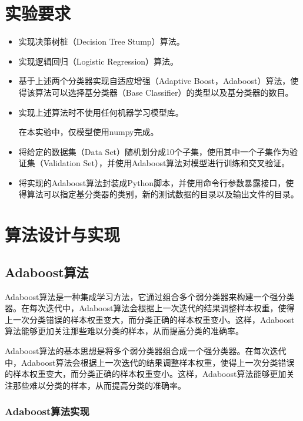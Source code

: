 \documentclass{paper}
\begin{document}
\tableofcontents
\newpage

\section{实验要求}
	\begin{itemize}
		\item 实现决策树桩（Decision Tree Stump）算法。
		\item 实现逻辑回归（Logistic Regression）算法。
		\item 基于上述两个分类器实现自适应增强（Adaptive Boost，Adaboost）算法，使得该算法可以选择基分类器（Base Classifier）的类型以及基分类器的数目。
		\item 实现上述算法时不使用任何机器学习模型库。

                在本实验中，仅模型使用numpy完成。

		\item 将给定的数据集（Data Set）随机划分成10个子集，使用其中一个子集作为验证集（Validation Set），并使用Adaboost算法对模型进行训练和交叉验证。
		\item 将实现的Adaboost算法封装成Python脚本，并使用命令行参数暴露接口，使得算法可以指定基分类器的类别，新的测试数据的目录以及输出文件的目录。
	\end{itemize}



\section{算法设计与实现}
	\subsection{Adaboost算法}

	    Adaboost算法是一种集成学习方法，它通过组合多个弱分类器来构建一个强分类器。在每次迭代中，Adaboost算法会根据上一次迭代的结果调整样本权重，使得上一次分类错误的样本权重变大，而分类正确的样本权重变小。这样，Adaboost算法能够更加关注那些难以分类的样本，从而提高分类的准确率。

	    Adaboost算法的基本思想是将多个弱分类器组合成一个强分类器。在每次迭代中，Adaboost算法会根据上一次迭代的结果调整样本权重，使得上一次分类错误的样本权重变大，而分类正确的样本权重变小。这样，Adaboost算法能够更加关注那些难以分类的样本，从而提高分类的准确率。

\subsubsection{Adaboost算法实现}
	
\end{document}
